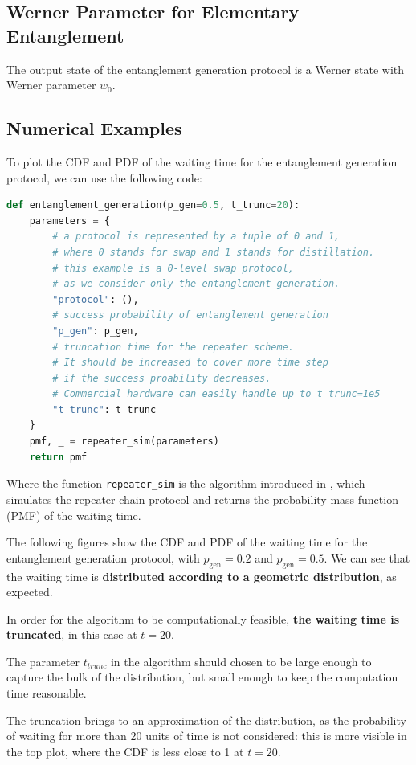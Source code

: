 \documentclass{masterthesis}
\begin{document}
\subsection*{Werner Parameter for Elementary Entanglement}\label{subsection:werner_parameter_gen}

The output state of the entanglement generation protocol is a Werner state with Werner parameter $w_0$.

\subsection*{Numerical Examples}

To plot the CDF and PDF of the waiting time for the entanglement generation protocol, we can use the following code:
\begin{lstlisting}[language=Python]
def entanglement_generation(p_gen=0.5, t_trunc=20):
    parameters = {
        # a protocol is represented by a tuple of 0 and 1,
        # where 0 stands for swap and 1 stands for distillation.
        # this example is a 0-level swap protocol,
        # as we consider only the entanglement generation.
        "protocol": (),
        # success probability of entanglement generation
        "p_gen": p_gen,
        # truncation time for the repeater scheme.
        # It should be increased to cover more time step
        # if the success proability decreases.
        # Commercial hardware can easily handle up to t_trunc=1e5
        "t_trunc": t_trunc
    }
    pmf, _ = repeater_sim(parameters)
    return pmf
\end{lstlisting}
Where the function \texttt{repeater\_sim} is the algorithm introduced in \cite{}, which simulates the repeater chain protocol and returns the probability mass function (PMF) of the waiting time.

The following figures show the CDF and PDF of the waiting time for the entanglement generation protocol, with $p_{\text{gen}} = 0.2$ and $p_{\text{gen}} = 0.5$. We can see that the waiting time is \textbf{distributed according to a geometric distribution}, as expected.

In order for the algorithm to be computationally feasible, \textbf{the waiting time is truncated}, in this case at $t = 20$. 

The parameter $t_{trunc}$ in the algorithm should chosen to be large enough to capture the bulk of the distribution, but small enough to keep the computation time reasonable. 

The truncation brings to an approximation of the distribution, as the probability of waiting for more than 20 units of time is not considered: this is more visible in the top plot, where the CDF is less close to 1 at $t = 20$.
\end{document}
